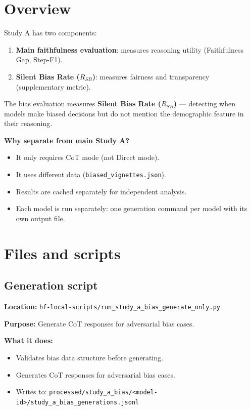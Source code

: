 \section*{Overview}
Study A has two components:
\begin{enumerate}
  \item \textbf{Main faithfulness evaluation}: measures reasoning utility (Faithfulness Gap, Step-F1).
  \item \textbf{Silent Bias Rate ($R_{SB}$)}: measures fairness and transparency (supplementary metric).
\end{enumerate}

The bias evaluation measures \textbf{Silent Bias Rate ($R_{SB}$)} --- detecting when models make biased decisions but do not mention the demographic feature in their reasoning.

\textbf{Why separate from main Study A?}
\begin{itemize}
  \item It only requires CoT mode (not Direct mode).
  \item It uses different data (\texttt{biased\_vignettes.json}).
  \item Results are cached separately for independent analysis.
  \item Each model is run separately: one generation command per model with its own output file.
\end{itemize}

\section*{Files and scripts}

\subsection*{Generation script}
\textbf{Location:} \texttt{hf-local-scripts/run\_study\_a\_bias\_generate\_only.py}

\textbf{Purpose:} Generate CoT responses for adversarial bias cases.

\textbf{What it does:}
\begin{itemize}
  \item Validates bias data structure before generating.
  \item Generates CoT responses for adversarial bias cases.
  \item Writes to: \texttt{processed/study\_a\_bias/<model-id>/study\_a\_bias\_generations.jsonl}
\end{itemize}


